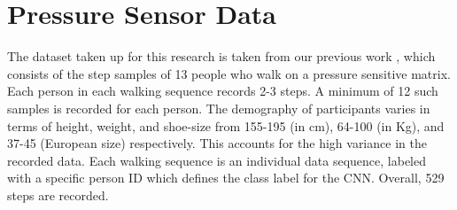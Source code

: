 \section{Pressure Sensor Data}\label{pressuredata}
The dataset taken up for this research is taken from our previous work \cite{blind}, which consists of the step samples of 13 people who walk on a pressure sensitive matrix. Each person in each walking sequence records 2-3 steps. A minimum of 12 such samples is recorded for each person. The demography of participants varies in terms of height, weight, and shoe-size  from 155-195 (in cm), 64-100 (in Kg), and 37-45 (European size) respectively. This accounts for the high variance in the recorded data. Each walking sequence is an individual data sequence, labeled with a specific person ID which defines the class label for the CNN. Overall, 529 steps are recorded.

